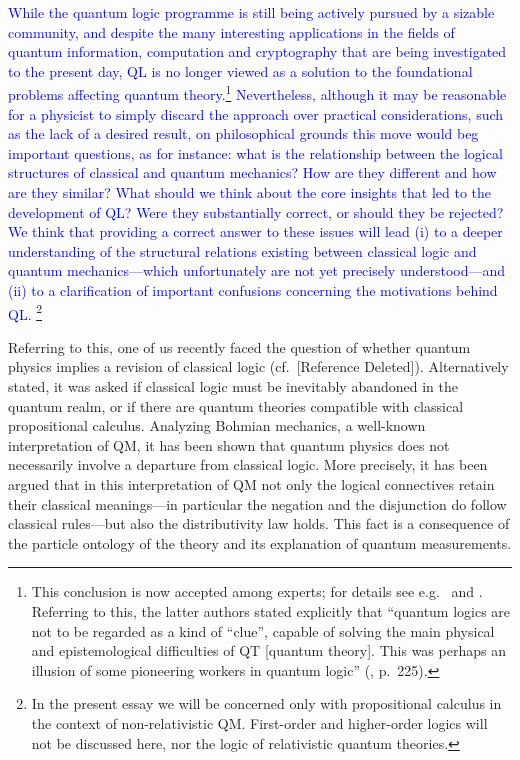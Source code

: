 \documentclass[11pt, executivepaper]{article}
\begin{document}
 \textcolor{blue}{While the quantum logic programme is still being actively pursued by a sizable community, and despite the many interesting applications in the fields of quantum information, computation and cryptography that are being investigated to the present day, QL is no longer viewed as a solution to the foundational problems affecting quantum theory.\footnote{This conclusion is now accepted among experts; for details see e.g.\ \cite{Bacciagaluppi:2009} and \cite{Giuntini:2002}. Referring to this, the latter authors stated explicitly that ``quantum logics are not to be regarded as a kind of ``clue'', capable of solving the main physical and epistemological difficulties of QT [quantum theory]. This was perhaps an illusion of some pioneering workers in quantum logic'' (\cite{Giuntini:2002}, p.\ 225).} Nevertheless, although it may be reasonable for a physicist to simply discard the approach over practical considerations, such as the lack of a desired result, on philosophical grounds this move would beg important questions, as for instance: what is the relationship between the logical structures of classical and quantum mechanics? How are they different and how are they similar? What should we think about the core insights that led to the development of QL? Were they substantially correct, or should they be rejected? We think that providing a correct answer to these issues will lead (i) to a deeper understanding of the structural relations existing between classical logic and quantum mechanics---which unfortunately are not yet precisely understood---and (ii) to a clarification of important confusions concerning the motivations behind QL. %
 \footnote{In the present essay we will be concerned only with propositional calculus in the context of non-relativistic QM. First-order and higher-order logics will not be discussed here, nor the logic of relativistic quantum theories.}} 


Referring to this, one of us recently faced the question of whether quantum physics implies a revision of classical logic (cf.\ [Reference Deleted]). Alternatively stated, it was asked if classical logic must be inevitably abandoned in the quantum realm, or if there are quantum theories compatible with classical propositional calculus. Analyzing Bohmian mechanics, a well-known interpretation of QM, it has been shown that quantum physics does not necessarily involve a departure from classical logic. More precisely, it has been argued that in this interpretation of QM not only the logical connectives retain their classical meanings---in particular the negation and the disjunction do follow classical rules---but also the distributivity law holds. This fact is a consequence of the particle ontology of the theory and its explanation of quantum measurements.
\end{document}
